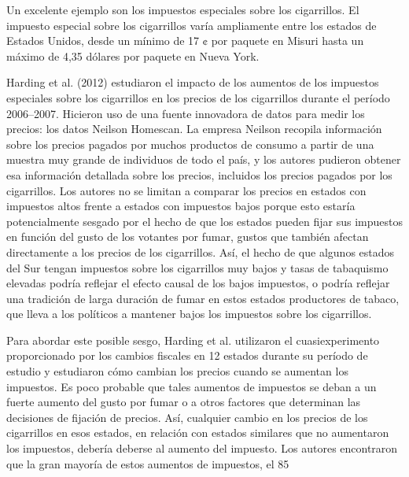 \documentclass[10pt,a4paper]{article}
\begin{document}
Un excelente ejemplo son los impuestos especiales sobre los cigarrillos. El impuesto especial sobre los cigarrillos varía ampliamente entre los estados de Estados Unidos, desde un mínimo de 17 ¢ por paquete en Misuri hasta un máximo de 4,35 dólares por paquete en Nueva York.

Harding et al. (2012) estudiaron el impacto de los aumentos de los impuestos especiales sobre los cigarrillos en los precios de los cigarrillos durante el período 2006–2007. Hicieron uso de una fuente innovadora de datos para medir los precios: los datos Neilson Homescan. La empresa Neilson recopila información sobre los precios pagados por muchos productos de consumo a partir de una muestra muy grande de individuos de todo el país, y los autores pudieron obtener esa información detallada sobre los precios, incluidos los precios pagados por los cigarrillos. Los autores no se limitan a comparar los precios en estados con impuestos altos frente a estados con impuestos bajos porque esto estaría potencialmente sesgado por el hecho de que los estados pueden fijar sus impuestos en función del gusto de los votantes por fumar, gustos que también afectan directamente a los precios de los cigarrillos. Así, el hecho de que algunos estados del Sur tengan impuestos sobre los cigarrillos muy bajos y tasas de tabaquismo elevadas podría reflejar el efecto causal de los bajos impuestos, o podría reflejar una tradición de larga duración de fumar en estos estados productores de tabaco, que lleva a los políticos a mantener bajos los impuestos sobre los cigarrillos.

Para abordar este posible sesgo, Harding et al. utilizaron el cuasiexperimento proporcionado por los cambios fiscales en 12 estados durante su período de estudio y estudiaron cómo cambian los precios cuando se aumentan los impuestos. Es poco probable que tales aumentos de impuestos se deban a un fuerte aumento del gusto por fumar o a otros factores que determinan las decisiones de fijación de precios. Así, cualquier cambio en los precios de los cigarrillos en esos estados, en relación con estados similares que no aumentaron los impuestos, debería deberse al aumento del impuesto. Los autores encontraron que la gran mayoría de estos aumentos de impuestos, el 85 %
\end{document}
